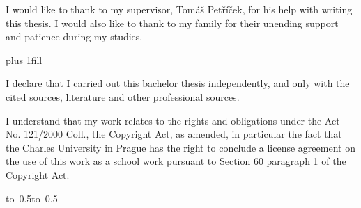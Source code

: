 \documentclass[12pt,a4paper]{report}
\let\openright=\clearpage
\begin{document}
\newpage



\openright

\noindent
I would like to thank to my supervisor, Tomáš Petříček,
for his help with writing this thesis.
I would also like to thank to my family for their unending support and patience during my studies.

\newpage


\vglue 0pt plus 1fill

\noindent
I declare that I carried out this bachelor thesis independently, and only with the cited
sources, literature and other professional sources.

\medskip\noindent
I understand that my work relates to the rights and obligations under the Act No.
121/2000 Coll., the Copyright Act, as amended, in particular the fact that the Charles
University in Prague has the right to conclude a license agreement on the use of this
work as a school work pursuant to Section 60 paragraph 1 of the Copyright Act.

\vspace{10mm}

\hbox{\hbox to 0.5\hbox to 0.5}

\vspace{20mm}
\newpage

\end{document}
